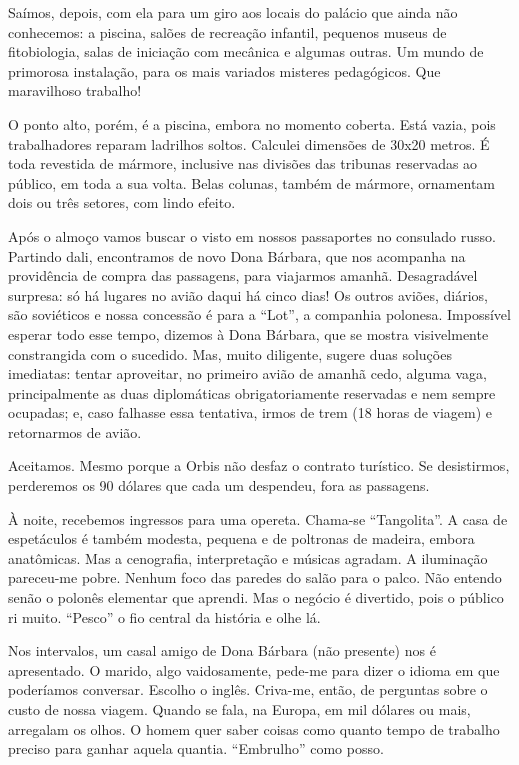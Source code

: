 Saímos, depois, com ela para um giro aos locais do palácio que ainda não conhecemos: a piscina, salões de recreação infantil, pequenos museus de fitobiologia, salas de iniciação com mecânica e algumas outras. Um mundo de primorosa instalação, para os mais variados misteres pedagógicos. Que maravilhoso trabalho!

O ponto alto, porém, é a piscina, embora no momento coberta. Está vazia, pois trabalhadores reparam ladrilhos soltos. Calculei dimensões de 30x20 metros. É toda revestida de mármore, inclusive nas divisões das tribunas reservadas ao público, em toda a sua volta. Belas colunas, também de mármore, ornamentam dois ou três setores, com lindo efeito.

Após o almoço vamos buscar o visto em nossos passaportes no consulado russo. Partindo dali, encontramos de novo Dona Bárbara, que nos acompanha na providência de compra das passagens, para viajarmos amanhã. Desagradável surpresa: só há lugares no avião daqui há cinco dias! Os outros aviões, diários, são soviéticos e nossa concessão é para a ``Lot'', a companhia polonesa. Impossível esperar todo esse tempo, dizemos à Dona Bárbara, que se mostra visivelmente constrangida com o sucedido. Mas, muito diligente, sugere duas soluções imediatas: tentar aproveitar, no primeiro avião de amanhã cedo, alguma vaga, principalmente as duas diplomáticas obrigatoriamente reservadas e nem sempre ocupadas; e, caso falhasse essa tentativa, irmos de trem (18 horas de viagem) e retornarmos de avião.

Aceitamos. Mesmo porque a Orbis não desfaz o contrato turístico. Se desistirmos, perderemos os 90 dólares que cada um despendeu, fora as passagens.

À noite, recebemos ingressos para uma opereta. Chama-se ``Tangolita''. A casa de espetáculos é também modesta, pequena e de poltronas de madeira, embora anatômicas. Mas a cenografia, interpretação e músicas agradam. A iluminação pareceu-me pobre. Nenhum foco das paredes do salão para o palco. Não entendo senão o polonês elementar que aprendi. Mas o negócio é divertido, pois o público ri muito. ``Pesco'' o fio central da história e olhe lá.

Nos intervalos, um casal amigo de Dona Bárbara (não presente) nos é apresentado. O marido, algo vaidosamente, pede-me para dizer o idioma em que poderíamos conversar. Escolho o inglês. Criva-me, então, de perguntas sobre o custo de nossa viagem. Quando se fala, na Europa, em mil dólares ou mais, arregalam os olhos. O homem quer saber coisas como quanto tempo de trabalho preciso para ganhar aquela quantia. ``Embrulho'' como posso.

